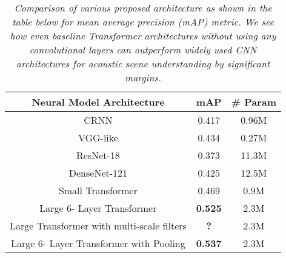 \documentclass{article}
\begin{document}
\begin{sloppy}
\begin{table}[ht]
  \caption{\itshape Comparison of various proposed architecture as shown in the table below for mean average precision (mAP) metric. We see how even baseline Transformer architectures without using any convolutional layers can outperform widely used CNN architectures for acoustic scene understanding by significant margins. \cite{fonseca2020fsd50k} }
	\centering
	\begin{tabular}{|c|c|c|}
		\hline
		Neural Model Architecture & mAP & \# Param\\\hline
		CRNN \cite{fonseca2020fsd50k} & 0.417 & 0.96M\\
		VGG-like \cite{fonseca2020fsd50k} & 0.434 & 0.27M \\
		ResNet-18 \cite{fonseca2020fsd50k} & 0.373  & 11.3M\\
		DenseNet-121 \cite{fonseca2020fsd50k} & 0.425 & 12.5M \\\hline
		Small Transformer & 0.469 & 0.9M\\
		Large 6- Layer Transformer & \textbf{0.525}  & 2.3M \\
		Large Transformer with multi-scale filters & \textbf{?}  & 2.3M \\
		Large 6- Layer Transformer with Pooling &  \textbf{0.537} & 2.3M
        \\\hline
	\end{tabular}
	\label{tab:example}
\end{table}






\end{sloppy}
\end{document}
